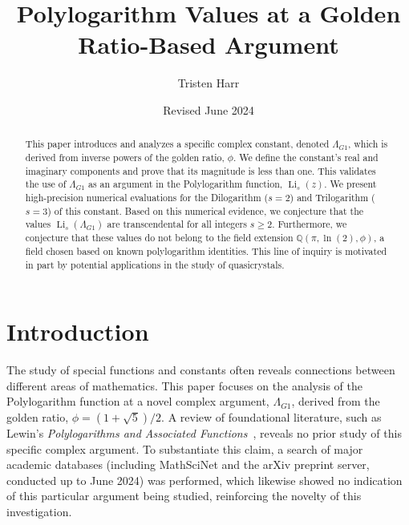 \documentclass{amsart}
\theoremstyle{plain}
\theoremstyle{definition}
\theoremstyle{remark}
\DeclareMathOperator{\Li}{Li}
\newcommand{\LambdaG}{\Lambda_{G1}}
\newcommand{\phiG}{\phi}
\begin{document}
\title[Polylogarithms at a Golden Ratio Argument]{Polylogarithm Values at a Golden Ratio-Based Argument}
\author{Tristen Harr}
\date{Revised June 2024}

\begin{abstract}
This paper introduces and analyzes a specific complex constant, denoted $\LambdaG$, which is derived from inverse powers of the golden ratio, $\phiG$. We define the constant's real and imaginary components and prove that its magnitude is less than one. This validates the use of $\LambdaG$ as an argument in the Polylogarithm function, $\Li_s(z)$. We present high-precision numerical evaluations for the Dilogarithm ($s=2$) and Trilogarithm ($s=3$) of this constant. Based on this numerical evidence, we conjecture that the values $\Li_s(\LambdaG)$ are transcendental for all integers $s \ge 2$. Furthermore, we conjecture that these values do not belong to the field extension $\mathbb{Q}(\pi, \ln(2), \phiG)$, a field chosen based on known polylogarithm identities. This line of inquiry is motivated in part by potential applications in the study of quasicrystals.
\end{abstract}

\maketitle

\section{Introduction}
The study of special functions and constants often reveals connections between different areas of mathematics. This paper focuses on the analysis of the Polylogarithm function at a novel complex argument, $\LambdaG$, derived from the golden ratio, $\phiG = (1+\sqrt{5})/2$. A review of foundational literature, such as Lewin's \textit{Polylogarithms and Associated Functions}~\cite{Lewin}, reveals no prior study of this specific complex argument. To substantiate this claim, a search of major academic databases (including MathSciNet and the arXiv preprint server, conducted up to June 2024) was performed, which likewise showed no indication of this particular argument being studied, reinforcing the novelty of this investigation.
\end{document}
